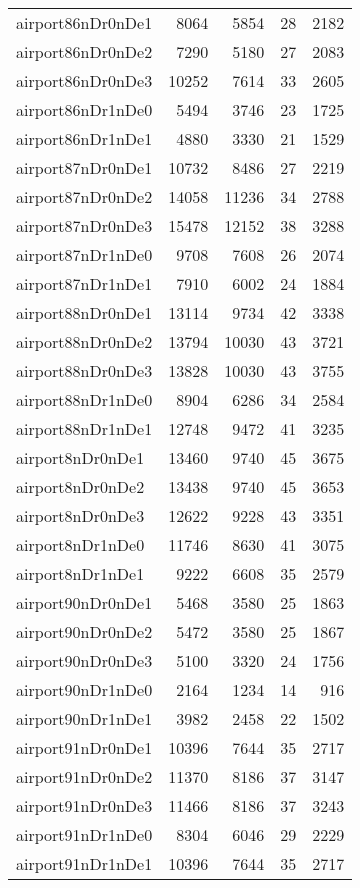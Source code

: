 \begin{longtable}{lrrrr}
airport86nDr0nDe1 & 8064 & 5854 & 28 & 2182 \\
airport86nDr0nDe2 & 7290 & 5180 & 27 & 2083 \\
airport86nDr0nDe3 & 10252 & 7614 & 33 & 2605 \\
airport86nDr1nDe0 & 5494 & 3746 & 23 & 1725 \\
airport86nDr1nDe1 & 4880 & 3330 & 21 & 1529 \\
airport87nDr0nDe1 & 10732 & 8486 & 27 & 2219 \\
airport87nDr0nDe2 & 14058 & 11236 & 34 & 2788 \\
airport87nDr0nDe3 & 15478 & 12152 & 38 & 3288 \\
airport87nDr1nDe0 & 9708 & 7608 & 26 & 2074 \\
airport87nDr1nDe1 & 7910 & 6002 & 24 & 1884 \\
airport88nDr0nDe1 & 13114 & 9734 & 42 & 3338 \\
airport88nDr0nDe2 & 13794 & 10030 & 43 & 3721 \\
airport88nDr0nDe3 & 13828 & 10030 & 43 & 3755 \\
airport88nDr1nDe0 & 8904 & 6286 & 34 & 2584 \\
airport88nDr1nDe1 & 12748 & 9472 & 41 & 3235 \\
airport8nDr0nDe1 & 13460 & 9740 & 45 & 3675 \\
airport8nDr0nDe2 & 13438 & 9740 & 45 & 3653 \\
airport8nDr0nDe3 & 12622 & 9228 & 43 & 3351 \\
airport8nDr1nDe0 & 11746 & 8630 & 41 & 3075 \\
airport8nDr1nDe1 & 9222 & 6608 & 35 & 2579 \\
airport90nDr0nDe1 & 5468 & 3580 & 25 & 1863 \\
airport90nDr0nDe2 & 5472 & 3580 & 25 & 1867 \\
airport90nDr0nDe3 & 5100 & 3320 & 24 & 1756 \\
airport90nDr1nDe0 & 2164 & 1234 & 14 & 916 \\
airport90nDr1nDe1 & 3982 & 2458 & 22 & 1502 \\
airport91nDr0nDe1 & 10396 & 7644 & 35 & 2717 \\
airport91nDr0nDe2 & 11370 & 8186 & 37 & 3147 \\
airport91nDr0nDe3 & 11466 & 8186 & 37 & 3243 \\
airport91nDr1nDe0 & 8304 & 6046 & 29 & 2229 \\
airport91nDr1nDe1 & 10396 & 7644 & 35 & 2717 \\

\end{longtable}
